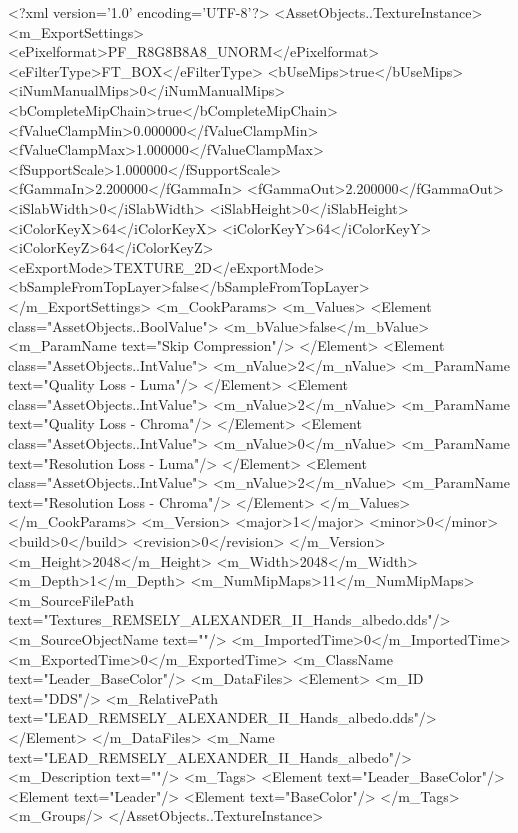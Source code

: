 <?xml version='1.0' encoding='UTF-8'?>
<AssetObjects..TextureInstance>
  <m_ExportSettings>
    <ePixelformat>PF_R8G8B8A8_UNORM</ePixelformat>
    <eFilterType>FT_BOX</eFilterType>
    <bUseMips>true</bUseMips>
    <iNumManualMips>0</iNumManualMips>
    <bCompleteMipChain>true</bCompleteMipChain>
    <fValueClampMin>0.000000</fValueClampMin>
    <fValueClampMax>1.000000</fValueClampMax>
    <fSupportScale>1.000000</fSupportScale>
    <fGammaIn>2.200000</fGammaIn>
    <fGammaOut>2.200000</fGammaOut>
    <iSlabWidth>0</iSlabWidth>
    <iSlabHeight>0</iSlabHeight>
    <iColorKeyX>64</iColorKeyX>
    <iColorKeyY>64</iColorKeyY>
    <iColorKeyZ>64</iColorKeyZ>
    <eExportMode>TEXTURE_2D</eExportMode>
    <bSampleFromTopLayer>false</bSampleFromTopLayer>
  </m_ExportSettings>
  <m_CookParams>
    <m_Values>
      <Element class="AssetObjects..BoolValue">
        <m_bValue>false</m_bValue>
        <m_ParamName text="Skip Compression"/>
      </Element>
      <Element class="AssetObjects..IntValue">
        <m_nValue>2</m_nValue>
        <m_ParamName text="Quality Loss - Luma"/>
      </Element>
      <Element class="AssetObjects..IntValue">
        <m_nValue>2</m_nValue>
        <m_ParamName text="Quality Loss - Chroma"/>
      </Element>
      <Element class="AssetObjects..IntValue">
        <m_nValue>0</m_nValue>
        <m_ParamName text="Resolution Loss - Luma"/>
      </Element>
      <Element class="AssetObjects..IntValue">
        <m_nValue>2</m_nValue>
        <m_ParamName text="Resolution Loss - Chroma"/>
      </Element>
    </m_Values>
  </m_CookParams>
  <m_Version>
    <major>1</major>
    <minor>0</minor>
    <build>0</build>
    <revision>0</revision>
  </m_Version>
  <m_Height>2048</m_Height>
  <m_Width>2048</m_Width>
  <m_Depth>1</m_Depth>
  <m_NumMipMaps>11</m_NumMipMaps>
  <m_SourceFilePath text="Textures\LEAD_REMSELY_ALEXANDER_II_Hands_albedo.dds"/>
  <m_SourceObjectName text=""/>
  <m_ImportedTime>0</m_ImportedTime>
  <m_ExportedTime>0</m_ExportedTime>
  <m_ClassName text="Leader_BaseColor"/>
  <m_DataFiles>
    <Element>
      <m_ID text="DDS"/>
      <m_RelativePath text="LEAD_REMSELY_ALEXANDER_II_Hands_albedo.dds"/>
    </Element>
  </m_DataFiles>
  <m_Name text="LEAD_REMSELY_ALEXANDER_II_Hands_albedo"/>
  <m_Description text=""/>
  <m_Tags>
    <Element text="Leader_BaseColor"/>
    <Element text="Leader"/>
    <Element text="BaseColor"/>
  </m_Tags>
  <m_Groups/>
</AssetObjects..TextureInstance>

